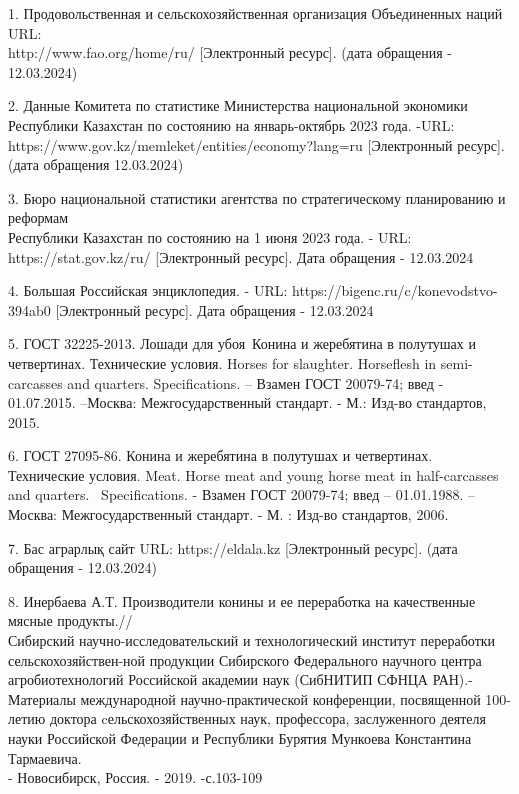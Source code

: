 \begin{noparindent}

1. Продовольственная и сельскохозяйственная организация Объединенных
наций URL:\\http://www.fao.org/home/ru/ {[}Электронный ресурс{]}. (дата
обращения - 12.03.2024)

2. Данные Комитета по статистике Министерства национальной экономики
Республики Казахстан по состоянию на январь-октябрь 2023 года. -URL:
https://www.gov.kz/memleket/entities/economy?lang=ru {[}Электронный
ресурс{]}. (дата обращения 12.03.2024)

3. Бюро национальной статистики агентства по стратегическому
планированию и реформам \\Республики Казахстан по состоянию на 1 июня 2023
года. - URL: https://stat.gov.kz/ru/ {[}Электронный ресурс{]}. Дата
обращения - 12.03.2024

4. Большая Российская энциклопедия. - URL:
https://bigenc.ru/c/konevodstvo-394ab0 {[}Электронный ресурс{]}. Дата
обращения - 12.03.2024

5. ГОСТ 32225-2013. Лошади для убоя~Конина и жеребятина в полутушах и
четвертинах. Технические условия. Horses for slaughter. Horseflesh in
semi-carcasses and quarters. Specifications. -- Взамен ГОСТ 20079-74;
введ - 01.07.2015. --Москва: Межгосударственный стандарт. - М.: Изд-во
стандартов, 2015.

6. ГОСТ 27095-86. Конина и жеребятина в полутушах и четвертинах.
Технические условия. Meat. Horse meat and young horse meat in
half-carcasses and quarters.~
Specifications. - Взамен ГОСТ 20079-74; введ -- 01.01.1988. --Москва:
Межгосударственный стандарт. - М. : Изд-во стандартов, 2006.

7. Бас аграрлық сайт URL: https://eldala.kz {[}Электронный ресурс{]}.
(дата обращения - 12.03.2024)

8. Инербаева А.Т. Производители конины и ее переработка на качественные
мясные продукты.//\\Сибирский научно-исследовательский и технологический
институт переработки сельскохозяйствен-ной продукции Сибирского
Федерального научного центра агробиотехнологий Российской академии наук
(СибНИТИП СФНЦА РАН).- Материалы международной научно-практической конференции, посвященной 100-летию
доктора cельскохозяйственных наук, профессора, заслуженного деятеля
науки Российской Федерации и Республики Бурятия Мункоева Константина
Тармаевича. \\- Новосибирск, Россия. - 2019. -с.103-109


\end{noparindent}
